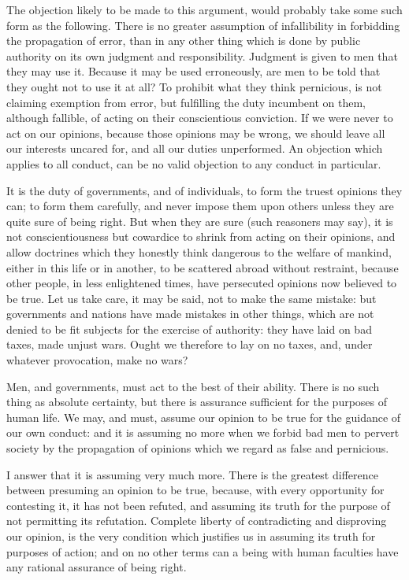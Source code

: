 The objection likely to be made to this argument, would probably take some such form as the following. There is no greater assumption of infallibility in forbidding the propagation of error, than in any other thing which is done by public authority on its own judgment and responsibility. Judgment is given to men that they may use it. Because it may be used erroneously, are men to be told that they ought not to use it at all? To prohibit what they think pernicious, is not claiming exemption from error, but fulfilling the duty incumbent on them, although fallible, of acting on their conscientious conviction. If we were never to act on our opinions, because those opinions may be wrong, we should leave all our interests uncared for, and all our duties unperformed. An objection which applies to all conduct, can be no valid objection to any conduct in particular.\par

It is the duty of governments, and of individuals, to form the truest opinions they can; to form them carefully, and never impose them upon others unless they are quite sure of being right. But when they are sure (such reasoners may say), it is not conscientiousness but cowardice to shrink from acting on their opinions, and allow doctrines which they honestly think dangerous to the welfare of mankind, either in this life or in another, to be scattered abroad without restraint, because other people, in less enlightened times, have persecuted opinions now believed to be true. Let us take care, it may be said, not to make the same mistake: but governments and nations have made mistakes in other things, which are not denied to be fit subjects for the exercise of authority: they have laid on bad taxes, made unjust wars. Ought we therefore to lay on no taxes, and, under whatever provocation, make no wars?\par

Men, and governments, must act to the best of their ability. There is no such thing as absolute certainty, but there is assurance sufficient for the purposes of human life. We may, and must, assume our opinion to be true for the guidance of our own conduct: and it is assuming no more when we forbid bad men to pervert society by the propagation of opinions which we regard as false and pernicious.\par

I answer that it is assuming very much more. There is the greatest difference between presuming an opinion to be true, because, with every opportunity for contesting it, it has not been refuted, and assuming its truth for the purpose of not permitting its refutation. Complete liberty of contradicting and disproving our opinion, is the very condition which justifies us in assuming its truth for purposes of action; and on no other terms can a being with human faculties have any rational assurance of being right.\par

